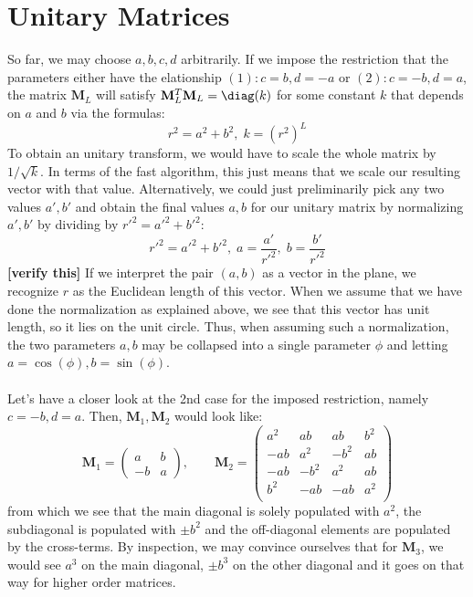 \section{Unitary Matrices}
So far, we may choose $a, b, c, d$ arbitrarily. If we impose the restriction that the parameters either have the elationship $(1): c=b, d=-a$ or $(2): c=-b, d=a$, the matrix $\mathbf{M}_L$ will satisfy $\mathbf{M}_L^T \mathbf{M}_L = \diag(k)$ for some constant $k$ that depends on $a$ and $b$ via the formulas:
\begin{equation}
 r^2 = a^2+b^2, \; k = (r^2)^L
\end{equation}
To obtain an unitary transform, we would have to scale the whole matrix by $1 / \sqrt{k}$. In terms of the fast algorithm, this just means that we scale our resulting vector with that value. Alternatively, we could just preliminarily pick any two values $a', b'$ and obtain the final values $a, b$ for our unitary matrix by normalizing $a', b'$ by dividing by $r'^2 = a'^2 + b'^2$:
\begin{equation}
 r'^2 = a'^2 + b'^2, \;
 a    = \frac{a'}{r'^2}, \; b = \frac{b'}{r'^2}
\end{equation}
\textbf{[verify this]}
If we interpret the pair $(a, b)$ as a vector in the plane, we recognize $r$ as the Euclidean length of this vector. When we assume that we have done the normalization as explained above, we see that this vector has unit length, so it lies on the unit circle. Thus, when assuming such a normalization, the two parameters $a, b$ may be collapsed into a single parameter $\phi$ and letting $a = \cos(\phi), b = \sin(\phi)$.


\paragraph{}
Let's have a closer look at the 2nd case for the imposed restriction, namely $c=-b, d=a$. Then, $\mathbf{M}_1, \mathbf{M}_2$ would look like:
\begin{equation}
 \mathbf{M}_1 =
 \begin{pmatrix}
  a & b \\
 -b & a 
 \end{pmatrix}, \qquad
 \mathbf{M}_2 =
 \begin{pmatrix}
 a^2 & ab   & ab   & b^2  \\
 -ab & a^2  & -b^2 & ab   \\
 -ab & -b^2 & a^2  & ab   \\ 
 b^2 & -ab  & -ab  & a^2  \\ 
 \end{pmatrix} 
\end{equation}
from which we see that the main diagonal is solely populated with $a^2$, the subdiagonal is populated with $\pm b^2$ and the off-diagonal elements are populated by the cross-terms. By inspection, we may convince ourselves that for $\mathbf{M}_3$, we would see $a^3$ on the main diagonal, $\pm b^3$ on the other diagonal and it goes on that way for higher order matrices.



